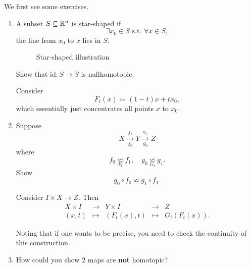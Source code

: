 \begin{exercise}
	We first see some exercises.
	\begin{enumerate}
		\item A subset \(S\subseteq \mathbb{\MakeUppercase{R}} ^n\) is star-shaped if
		      \[
			      \exists x_0\in S \text{ s.t. }\forall x\in S,
		      \]
		      the line from \(x_0\) to \(x\) lies in \(S\).
		      \begin{figure}[H]
			      \centering
			      \caption{Star-shaped illustration}
			      \label{fig:eg-star-shaped}
		      \end{figure}
		      Show that \(\mathrm{id}\colon S\to S\) is nullhomotopic.

		      \begin{answer}
			      Consider
			      \[
				      F_{t}(x) \coloneqq (1 - t)x+tx_0,
			      \]
			      which essentially just concentrates all points \(x\) to \(x_0\).
		      \end{answer}
		\item Suppose
		      \[
			      X\underset{f_0}{\overset{f_1}{\to}} Y\underset{g_0}{\overset{g_1}{\to}} Z
		      \]
		      where
		      \[
			      f_0 \underset{F_{t}}{\backsimeq} f_1,\quad g_0\underset{G_{t}}{\backsimeq} g_1.
		      \]
		      Show
		      \[
			      g_0\circ f_0\backsimeq g_{1}\circ f_1.
		      \]
		      \begin{answer}
			      Consider \(I\times X\to Z\). Then
			      \[
				      \begin{array}{ccccc}
					      X \times I & \to     & Y \times I  & \to     & Z                \\
					      (x, t)     & \mapsto & (F_t(x), t) & \mapsto & G_{t}(F_{t}(x)).
				      \end{array}
			      \]
		      \end{answer}
		      \begin{remark}
			      Noting that if one wants to be precise, you need to check the continuity of this construction.
		      \end{remark}
		\item How could you show \(2\) maps are \textbf{not} homotopic?
		      \begin{answer}

		      \end{answer}
	\end{enumerate}
\end{exercise}